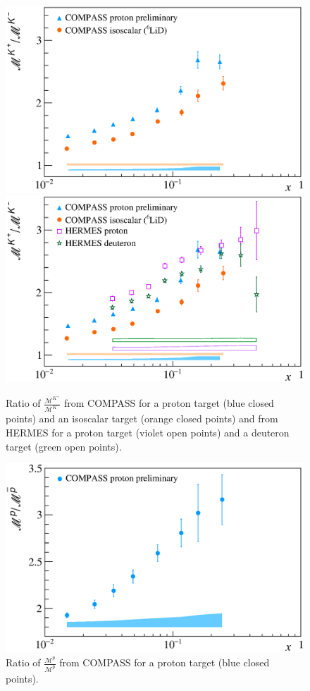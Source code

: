 \begin{figure}[!h]
  \centering
	\includegraphics[scale=0.5]{./gfx/Mult_k_ratio_noH.eps}
	\includegraphics[scale=0.5]{./gfx/Mult_k_ratio.eps}
	\caption{Ratio of $\frac{\mathscr{M}^{K^+}}{\mathscr{M}^{K^-}}$ from COMPASS for a proton target (blue closed points) and an isoscalar target (orange closed points) and from HERMES for a proton target (violet open points) and a deuteron target (green open points).}
	\label{pic:kratio}
\end{figure}

\begin{figure}[!h]
  \centering
	\includegraphics[scale=0.48]{./gfx/Mult_p_ratio.eps}
	\caption{Ratio of $\frac{\mathscr{M}^{p}}{\mathscr{M}^{\overline{p}}}$ from COMPASS for a proton target (blue closed points).}
	\label{pic:pratio}
\end{figure}

